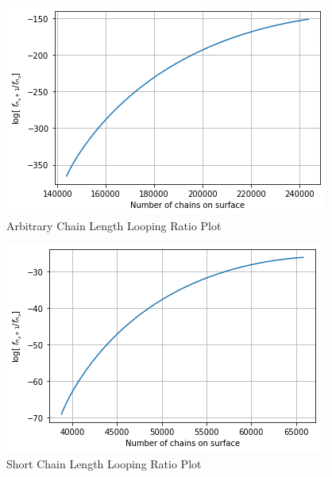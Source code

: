 \documentclass[10pt,letterpaper]{article}
\begin{document}
\begin{figure}[h!]
	\centering
	\includegraphics[scale=0.85]{plotFigure_3.png}
	\caption{Arbitrary Chain Length Looping Ratio Plot}
	\label{Arbitrary}
\end{figure}



\begin{figure}[h!]
	\centering
	\includegraphics[scale=0.85]{plotFigure_4.png}
	\caption{Short Chain Length Looping Ratio Plot}
	\label{Short}
\end{figure}
\end{document}
